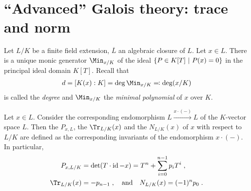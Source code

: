 \documentclass[a4paper,parskip=half,numbers=enddot, DIV=12]{scrreprt}
\begin{document}
\section{``Advanced'' Galois theory: trace and norm}
Let $L/K$ be a finite field extension, $\overline{L}$ an algebraic closure of $L$. Let $x\in L$. There is a unique monic generator $\Min_{x/K}$ of the ideal $\left\{P\in K[T]\ \middle|\  P(x) = 0\right\}$ in the principal ideal domain $K[T]$. Recall that 
\begin{align*}
	d=[K(x):K]=\deg\Min_{x/K}\eqqcolon\deg(x/K)
\end{align*}
is called the \emph{degree} and $\Min_{x/K}$ the \emph{minimal polynomial} of $x$ over $K$.
\begin{defi}
	Let $x\in L$. Consider the corresponding endomorphism $L\xrightarrow{x\cdot(-)} L$ of the $K$-vector space $L$. Then the  $P_{x,L}$, the  $\Tr_{L/K}(x)$ and the  $N_{L/K}(x)$ of $x$ with respect to $L/K$ are defined as the corresponding invariants of the endomorphism $x\cdot(-)$. In particular,
	\begin{align*}
		P_{x,L/K} &= \det(T\cdot \id -x) = T^n+\sum_{i=0}^{n-1} p_iT^i\;,\\
		\Tr_{L/K}(x)&=-p_{n-1}\;,\quad\text{and}\quad N_{L/K}(x)=(-1)^{n}p_0\;.
	\end{align*}
\end{defi}
\end{document}
